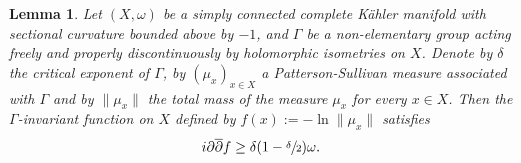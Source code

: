 \documentclass[11pt]{article}
\newtheorem{lemma}[theorem]{Lemma}
\theoremstyle{definition}
\begin{document}
\begin{lemma}\label{lem-f-unif-spsh}
Let $(X,\omega)$ be a simply connected complete Kähler manifold with sectional curvature bounded above by $-1$, and $\Gamma$ be a non-elementary group acting freely and properly discontinuously by holomorphic isometries on $X$. Denote by $\delta$ the critical exponent of $\Gamma$, by $(\mu_x)_{x\in X}$ a Patterson-Sullivan measure associated with $\Gamma$ and by $\lVert \mu_x\rVert$ the total mass of the measure $\mu_x$ for every $x\in X$. Then the $\Gamma$\nobreakdash-invariant function on $X$ defined by $f(x):=-\ln \lVert \mu_x\rVert$ satisfies
\begin{equation*}
i\partial\overline{\partial}{f} \ge \delta(1-\sfrac{\delta}{2})\omega.
\end{equation*}
\end{lemma}
\end{document}
